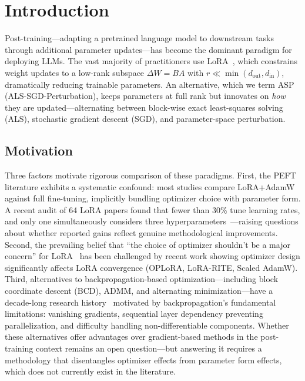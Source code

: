 \documentclass[11pt]{article}
\begin{document}
\section{Introduction}

Post-training---adapting a pretrained language model to downstream tasks through additional parameter updates---has become the dominant paradigm for deploying LLMs. The vast majority of practitioners use LoRA~\cite{hu2022lora}, which constrains weight updates to a low-rank subspace $\Delta W = BA$ with $r \ll \min(d_{\text{out}}, d_{\text{in}})$, dramatically reducing trainable parameters. An alternative, which we term ASP (ALS-SGD-Perturbation), keeps parameters at full rank but innovates on \textit{how} they are updated---alternating between block-wise exact least-squares solving (ALS), stochastic gradient descent (SGD), and parameter-space perturbation.

\subsection{Motivation}

Three factors motivate rigorous comparison of these paradigms. First, the PEFT literature exhibits a systematic confound: most studies compare LoRA+AdamW against full fine-tuning, implicitly bundling optimizer choice with parameter form. A recent audit of 64 LoRA papers found that fewer than 30\% tune learning rates, and only one simultaneously considers three hyperparameters~\cite{lee2026learning}---raising questions about whether reported gains reflect genuine methodological improvements. Second, the prevailing belief that ``the choice of optimizer shouldn't be a major concern'' for LoRA~\cite{raschka2023practical} has been challenged by recent work showing optimizer design significantly affects LoRA convergence (OPLoRA, LoRA-RITE, Scaled AdamW). Third, alternatives to backpropagation-based optimization---including block coordinate descent (BCD), ADMM, and alternating minimization---have a decade-long research history~\cite{zeng2019global,wang2018accelerated,choromanska2019beyond,taylor2016training} motivated by backpropagation's fundamental limitations: vanishing gradients, sequential layer dependency preventing parallelization, and difficulty handling non-differentiable components. Whether these alternatives offer advantages over gradient-based methods in the post-training context remains an open question---but answering it requires a methodology that disentangles optimizer effects from parameter form effects, which does not currently exist in the literature.
\end{document}
